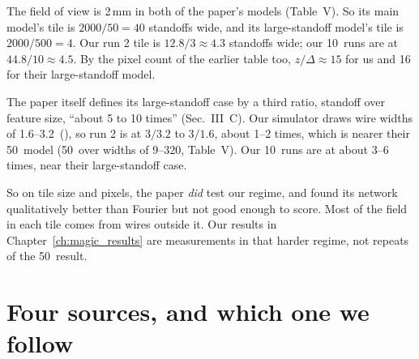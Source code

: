 \begin{careful}
The field of view is 2\,mm in both of the paper's models (Table~V). So its main model's tile is $2000/50 = 40$
standoffs wide, and its large-standoff model's tile is $2000/500 = 4$. Our run 2 tile is $12.8/3 \approx 4.3$ standoffs
wide; our 10\um\ runs are at $44.8/10 \approx 4.5$. By the pixel count of the earlier table too, $z/\Delta \approx 15$ for
us and 16 for their large-standoff model.

The paper itself defines its large-standoff case by a third ratio, standoff over feature size, ``about 5 to 10 times''
(Sec.~III~C). Our simulator draws wire widths of 1.6--3.2\um\ (), so run 2 is at
$3/3.2$ to $3/1.6$, about 1--2 times, which is nearer their 50\um\ model (50\um\ over widths of 9--320\um, Table~V).
Our 10\um\ runs are at about 3--6 times, near their large-standoff case.

So on tile size and pixels, the paper \emph{did} test our regime, and found its network qualitatively better than
Fourier but not good enough to score. Most of the field in each tile comes from wires outside it. Our results in Chapter~\ref{ch:magic_results} are
measurements in that harder regime, not repeats of the 50\um\ result.
\end{careful}

\section{Four sources, and which one we follow}\label{sec:magic_sources}

